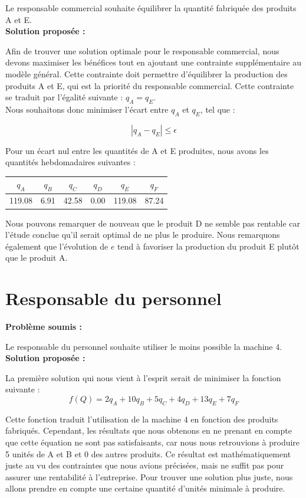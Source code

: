 \documentclass[paper=a4, fontsize=11pt]{report}
\numberwithin{equation}{section}		%
\numberwithin{figure}{section}			%
\numberwithin{table}{section}				%
\renewcommand{\bf}[1]{\textbf{#1}}
\newcommand\abs[1]{\left|#1\right|}
\begin{document}
Le responsable commercial souhaite équilibrer la quantité fabriquée des produits A et E.\\

\bf{Solution proposée :}

Afin de trouver une solution optimale pour le responsable commercial, nous devons maximiser les bénéfices tout en ajoutant une contrainte supplémentaire au modèle général. Cette contrainte doit permettre d'équilibrer la production des produits A et E, qui est la priorité du responsable commercial. Cette contrainte se traduit par l'égalité suivante : $q_A = q_E$. \\

Nous souhaitons donc minimiser l'écart entre $q_A$ et $q_E$, tel que :

\[ \abs{q_A - q_E} \leq \epsilon \] 

Pour un écart nul entre les quantités de A et E produites, nous avons les quantités hebdomadaires suivantes :
\begin{center}
\begin{tabular}{cccccc}
\hline
$q_A$ & $q_B$ & $q_C$ & $q_D$ & $q_E$ & $q_F$ \\
\hline
119.08 & 6.91 & 42.58 & 0.00 & 119.08 & 87.24 \\
\hline
\end{tabular}
\end{center}

Nous pouvons remarquer de nouveau que le produit D ne semble pas rentable car l'étude conclue qu'il serait optimal de ne plus le produire. Nous remarquons également que l’évolution de $e$ tend à favoriser la production du produit E plutôt que le produit A.

\section{Responsable du personnel}
\bf{Problème soumis :}

Le responsable du personnel souhaite utiliser le moins possible la machine 4.\\

\bf{Solution proposée :}

La première solution qui nous vient à l’esprit serait de minimiser la fonction suivante : \[f(Q) = 2q_A + 10q_B + 5q_C + 4q_D + 13q_E + 7q_F\]

Cette fonction traduit l'utilisation de la machine 4 en fonction des produits fabriqués. Cependant, les résultats que nous obtenons en ne prenant en compte que cette équation ne sont pas satisfaisants, car nous nous retrouvions à produire 5 unités de A et B et 0 des autres produits. Ce résultat est mathématiquement juste au vu des contraintes que nous avions précisées, mais ne suffit pas pour assurer une rentabilité à l’entreprise. Pour trouver une solution plus juste, nous allons prendre en compte une certaine quantité d’unités minimale à produire. \\
\end{document}
